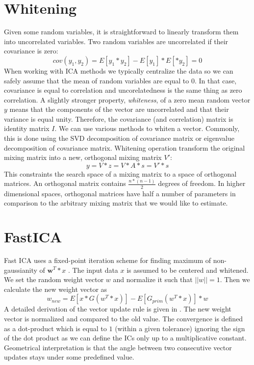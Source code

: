 \documentclass{article}
\begin{document}
\section{Whitening}
Given some random variables, it is straightforward to linearly transform them into uncorrelated variables.
Two random variables are uncorrelated if their covariance is zero:
\begin{equation}
    cov(y_1, y_2) = E\left[y_1*y_2\right] - E\left[y_1\right] * E\left[*y_2\right] = 0
\end{equation}
When working with ICA methods we typically centralize the data so we can safely assume that the mean of
random variables are equal to $0$. In that case, covariance is equal to correlation and uncorelatedness is the same thing as zero correlation.
A slightly stronger property, \textit{whiteness}, of a zero mean random vector $y$ means that the components of the vector are uncorrelated and that their variance is equal unity. Therefore, the covariance (and correlation) matrix is identity matrix $I$. We can use various methods to whiten a vector.
Commonly, this is done using the SVD decomposition of covariance matrix or eigenvalue decomposition of covariance matrix. Whitening operation transform the original mixing matrix into a new, orthogonal mixing matrix $V'$:
\begin{equation}
    y = V * z = V * A * s = V' * s
\end{equation}
This constraints the search space of a mixing matrix to a space of orthogonal matrices. An orthogonal matrix contains $\frac{n * (n-1)}{2}$ degrees of freedom. In higher dimensional spaces, orthogonal matrices have half a number of parameters in comparison to the arbitrary mixing matrix that we would like
to estimate.

\section{FastICA}
Fast ICA  \cite{Hyvarinen1997} uses a fixed-point iteration scheme for finding maximum of non-gaussianity of $\textbf{w}^T * x$ \cite{Hyvarinen1997}.
The input data $x$ is assumed to be centered and whitened.
We set the random weight vector $w$ and normalize it such that $||w|| = 1$. Then we calculate the new
weight vector as
\begin{equation}
    w_{new} = E\left[x*G(w^T*x)\right] - E\left[G_{prim}(w^T*x)\right] * w
\end{equation}
A detailed derivation of the vector update rule is given in \cite{Hyvarinen2000}. The new weight vector is normalized and compared to the old value. The convergence is defined as a dot-product which is equal to $1$ (within a given tolerance) ignoring the sign of the dot product as we can define the ICs only up to a multiplicative constant. Geometrical interpretation is that the angle between two consecutive vector updates stays under some predefined value.
\end{document}
